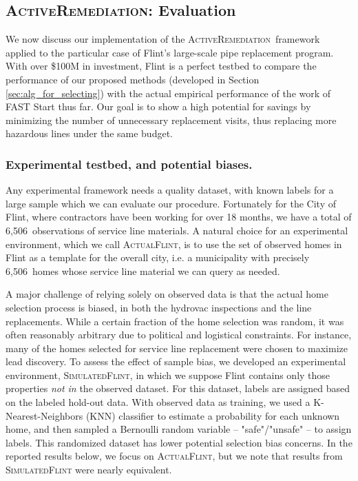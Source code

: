 \documentclass[sigconf]{acmart}
\def\activerem{\textsc{ActiveRemediation}\xspace}
\begin{document}
\subsection{\activerem: Evaluation}
\label{sec:empirical_optimization}

\newcommand{\numInitObservedHomes}{6,506\xspace}
\newcommand{\ActualFlint}{\textsc{ActualFlint}\xspace}
\newcommand{\SimulatedFlint}{\textsc{SimulatedFlint}\xspace}

We now discuss our implementation of the \activerem\ framework applied to the particular case of Flint's large-scale pipe replacement program. With over \$100M in investment, Flint is a perfect testbed to compare the performance of our proposed methods (developed in Section \ref{sec:alg_for_selecting}) with the actual empirical performance of the work of FAST Start thus far. Our goal is to show a high potential for savings by minimizing the number of unnecessary replacement visits, thus replacing more hazardous lines under the same budget.


\subsubsection{Experimental testbed, and potential biases.} Any experimental framework needs a quality dataset, with known labels for a large sample which we can evaluate our procedure. Fortunately for the City of Flint, where contractors have been working for over 18 months, we have a total of \numInitObservedHomes\ observations of service line materials. A natural choice for an experimental environment, which we call \ActualFlint, is to use the set of observed homes in Flint as a template for the overall city, i.e. a municipality with precisely \numInitObservedHomes\ homes whose service line material we can query as needed.

A major challenge of relying solely on observed data is that the actual home selection process is biased, in both the hydrovac inspections and the line replacements. While a certain fraction of the home selection was random,  it was often reasonably arbitrary due to political and logistical constraints. For instance, many of the homes selected for service line replacement were chosen to maximize lead discovery. To assess the effect of sample bias, we developed an experimental environment, \SimulatedFlint, in which we suppose Flint contains only those properties \emph{not in} the observed dataset. For this dataset, labels are assigned based on the labeled hold-out data. With observed data as training, we used a K-Nearest-Neighbors (KNN) classifier to estimate a probability for each unknown home, and then sampled a Bernoulli random variable -- "safe"/"unsafe" -- to assign labels. This randomized dataset has lower potential selection bias concerns. In the reported results below, we focus on \ActualFlint, but we note that results from \SimulatedFlint were nearly equivalent.
\end{document}
